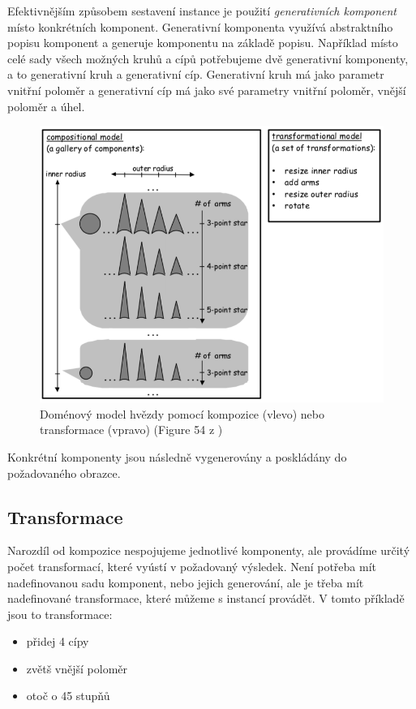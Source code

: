 Efektivnějším způsobem sestavení instance je použití \textit{generativních komponent} místo konkrétních komponent. Generativní komponenta využívá abstraktního popisu komponent a generuje komponentu na základě popisu. Například místo celé sady všech možných kruhů a cípů potřebujeme dvě generativní komponenty, a to generativní kruh a generativní cíp. Generativní kruh má jako parametr vnitřní poloměr a generativní cíp má jako své parametry vnitřní poloměr, vnější poloměr a úhel.
\begin{figure}[H]
	\centering
	\includegraphics[width=13cm]{images/transformation_vs_composition}
	\caption{Doménový model hvězdy pomocí kompozice (vlevo) nebo transformace (vpravo) (Figure 54 z \cite{Czarnecki98} )}
\end{figure}
Konkrétní komponenty jsou následně vygenerovány a poskládány do požadovaného obrazce.

\subsection{Transformace}
Narozdíl od kompozice nespojujeme jednotlivé komponenty, ale provádíme určitý počet transformací, které vyústí v požadovaný výsledek. Není potřeba mít nadefinovanou sadu komponent, nebo jejich generování, ale je třeba mít nadefinované transformace, které můžeme s instancí provádět. V tomto příkladě jsou to transformace: 
\begin{itemize}
	\item přidej 4 cípy
	\item zvětš vnější poloměr
	\item otoč o 45 stupňů
\end{itemize}

